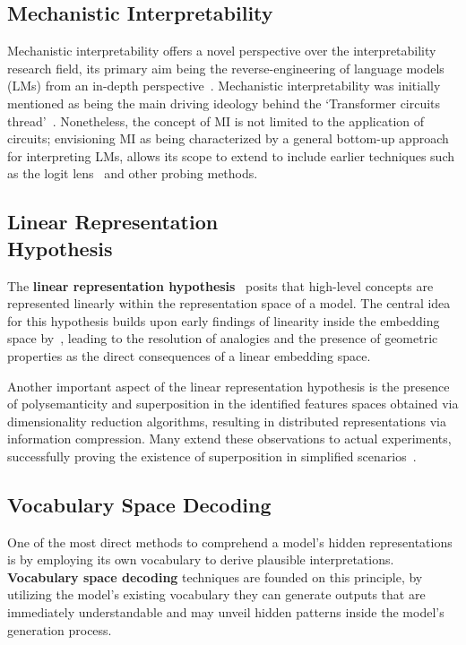 \documentclass[11pt,a4paper,twocolumn]{article}
\begin{document}
\subsection{Mechanistic Interpretability}

Mechanistic interpretability offers a novel perspective over the interpretability research field, its primary aim being the reverse-engineering of language models (LMs) from an in-depth perspective~\cite{olah2022}.
Mechanistic interpretability was initially mentioned as being the main driving ideology behind the `Transformer circuits thread'~\cite{elhage2023}.
Nonetheless, the concept of MI is not limited to the application of circuits; envisioning MI as being characterized by a general bottom-up approach for interpreting LMs, allows its scope to extend to include earlier techniques such as the logit lens~\cite{nostalgebraist2020} and other probing methods.

\subsection{Linear Representation \texorpdfstring{ \\ }{} Hypothesis}

The \textbf{linear representation hypothesis}~\cite{park2023} posits that high-level concepts are represented linearly within the representation space of a model.
The central idea for this hypothesis builds upon early findings of linearity inside the embedding space by~\citet{mikolov2013}, leading to the resolution of analogies and the presence of geometric properties as the direct consequences of a linear embedding space.

Another important aspect of the linear representation hypothesis is the presence of polysemanticity and superposition in the identified features spaces obtained via dimensionality reduction algorithms, resulting in distributed representations via information compression.
Many extend these observations to actual experiments, successfully proving the existence of superposition in simplified scenarios~\cite{elhage2022}.

\subsection{Vocabulary Space Decoding}

One of the most direct methods to comprehend a model's hidden representations is by employing its own vocabulary to derive plausible interpretations.
\textbf{Vocabulary space decoding} techniques are founded on this principle, by utilizing the model's existing vocabulary they can generate outputs that are immediately understandable and may unveil hidden patterns inside the model's generation process.
\end{document}

